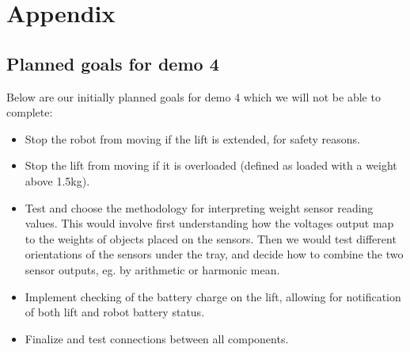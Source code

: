 \documentclass{article}
\begin{document}
\begin{table}[h]
  \begin{center}
    \begin{small}
      \begin{sc}
\end{sc}
\end{small}
\caption{Budgeted technician time at demo \demoNumber. Note that hours remaining includes subtracting any hours lost due to not being used in previous weeks.}
\label{tab:budget-cost-non-monetary}
\end{center}
\end{table}


\clearpage
\section{Appendix}
\subsection{Planned goals for demo 4}
\label{goals}
Below are our initially planned goals for demo 4 which we will not be able to complete:
\begin{itemize}
  \item Stop the robot from moving if the lift is extended, for safety reasons.
  \item Stop the lift from moving if it is overloaded (defined as loaded with a weight above 1.5kg).
  \item Test and choose the methodology for interpreting weight sensor reading values. This would involve first understanding how the voltages output map to the weights of objects placed on the sensors. Then we would test different orientations of the sensors under the tray, and decide how to combine the two sensor outputs, eg. by arithmetic or harmonic mean. 
  \item Implement checking of the battery charge on the lift, allowing for notification of both lift and robot battery status.
  \item Finalize and test connections between all components. 
\end{itemize}
\end{document}
